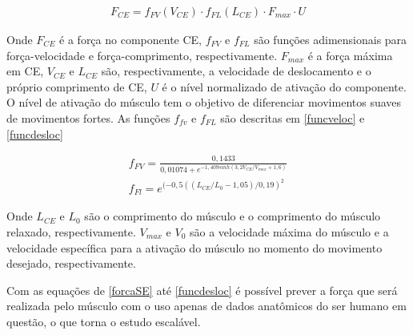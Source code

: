 \begin{align}
F_{CE} = f_{FV}(V_{CE}) \cdot f_{FL}(L_{CE}) \cdot F_{max} \cdot U \label{forcaCE}
\end{align}

Onde $F_{CE}$ é a força no componente CE, $f_{FV}$ e $f_{FL}$ são funções adimensionais para força-velocidade e força-comprimento, respectivamente. $F_{max}$ é a força máxima em CE, $V_{CE}$ e $L_{CE}$ são, respectivamente, a velocidade de deslocamento e o próprio comprimento de CE, $U$ é o nível normalizado de ativação do componente. O nível de ativação do músculo tem o objetivo de diferenciar movimentos suaves de movimentos fortes. As funções $f_{fv}$ e $f_{FL}$ são descritas em \ref{funcveloc} e \ref{funcdesloc}

\begin{align}
f_{FV} = \frac{0,1433}{0,01074+ e^{-1,409sinh(3,2V_{CE}/V_{max}+1,6)}} \label{funcveloc} \\
f_{Fl} = e^{(-0,5((L_{CE}/L_0-1,05)/0,19)^2} \label{funcdesloc}
\end{align}


Onde $L_{CE}$ e $L_0$ são o comprimento do músculo e o comprimento do músculo relaxado, respectivamente. $V_{max}$ e $V_{0}$ são a velocidade máxima do músculo e a velocidade específica para a ativação do músculo no momento do movimento desejado, respectivamente.

Com as equações de \ref{forcaSE} até \ref{funcdesloc} é possível prever a força que será realizada pelo músculo com o uso apenas de dados anatômicos do ser humano em questão, o que torna o estudo escalável.